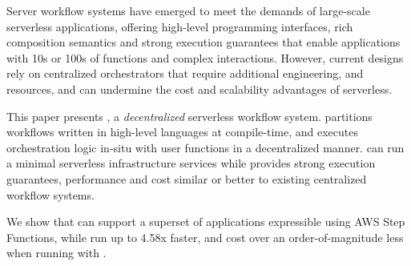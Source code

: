 Server workflow systems have emerged to meet the demands of large-scale
serverless applications, offering high-level programming interfaces, rich
composition semantics and strong execution guarantees that enable applications
with 10s or 100s of functions and complex interactions. However, current
designs rely on centralized orchestrators that require additional engineering,
and resources, and can undermine the cost and scalability advantages of
serverless.

This paper presents \name{}, a \emph{decentralized} serverless workflow
system. \name{} partitions workflows written in high-level languages at
compile-time, and executes orchestration logic in-situ with user functions in
a decentralized manner. \name{} can run a minimal serverless infrastructure
services while provides strong execution guarantees, performance and cost
similar or better to existing centralized workflow systems.

We show that \name{} can support a superset of applications expressible using
AWS Step Functions, while run up to 4.58x faster, and cost over an
order-of-magnitude less when running with \name{}.
